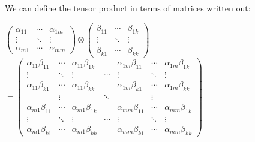 We can define the tensor product in terms of matrices written out:
\begin{center}
    $\begin{pmatrix}
        \alpha_{11} & \cdots & \alpha_{1m} \\
        \vdots & \ddots & \vdots \\
        \alpha_{m1} & \cdots & \alpha_{mm}
    \end{pmatrix}
    \otimes
    \begin{pmatrix}
        \beta_{11} & \cdots & \beta_{1k} \\
        \vdots & \ddots & \vdots \\
        \beta_{k1} & \cdots & \beta_{kk}
    \end{pmatrix}$
    $=
    \begin{pmatrix}
        \alpha_{11}\beta_{11} & \cdots & \alpha_{11}\beta_{1k} &  & \alpha_{1m}\beta_{11} & \cdots & \alpha_{1m}\beta_{1k} \\
        \vdots & \ddots & \vdots & \cdots & \vdots & \ddots & \vdots \\
        \alpha_{11}\beta_{k1} & \cdots & \alpha_{11}\beta_{kk} &  & \alpha_{1m}\beta_{k1} & \cdots & \alpha_{1m}\beta_{kk} \\
        & \vdots &  & \ddots &  & \vdots &  \\
        \alpha_{m1}\beta_{11} & \cdots & \alpha_{m1}\beta_{1k} &  & \alpha_{mm}\beta_{11} & \cdots & \alpha_{mm}\beta_{1k} \\
        \vdots & \ddots & \vdots & \cdots & \vdots & \ddots & \vdots \\
        \alpha_{m1}\beta_{k1} & \cdots & \alpha_{m1}\beta_{kk} &  & \alpha_{mm}\beta_{k1} & \cdots & \alpha_{mm}\beta_{kk}
    \end{pmatrix}$
\end{center}